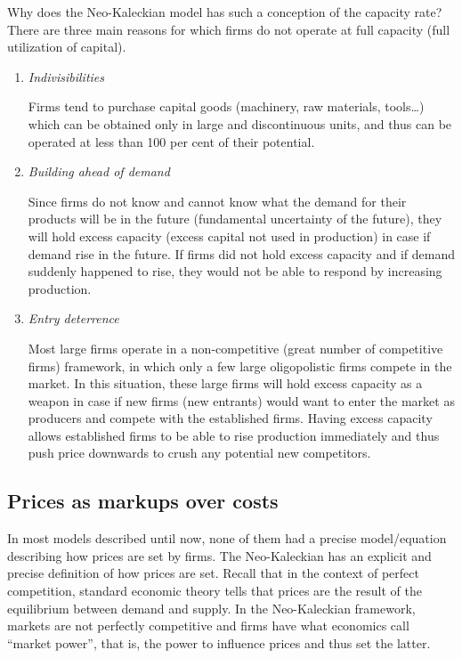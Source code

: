 \documentclass[
  letterpaper,
  DIV=11,
  numbers=noendperiod]{scrreprt}
\begin{document}
Why does the Neo-Kaleckian model has such a conception of the capacity
rate? There are three main reasons for which firms do not operate at
full capacity (full utilization of capital).

\begin{enumerate}
\def\labelenumi{\arabic{enumi}.}
\item
  \emph{Indivisibilities}

  Firms tend to purchase capital goods (machinery, raw materials,
  tools\ldots) which can be obtained only in large and discontinuous
  units, and thus can be operated at less than 100 per cent of their
  potential.
\item
  \emph{Building ahead of demand}

  Since firms do not know and cannot know what the demand for their
  products will be in the future (fundamental uncertainty of the
  future), they will hold excess capacity (excess capital not used in
  production) in case if demand rise in the future. If firms did not
  hold excess capacity and if demand suddenly happened to rise, they
  would not be able to respond by increasing production.
\item
  \emph{Entry deterrence}

  Most large firms operate in a non-competitive (great number of
  competitive firms) framework, in which only a few large oligopolistic
  firms compete in the market. In this situation, these large firms will
  hold excess capacity as a weapon in case if new firms (new entrants)
  would want to enter the market as producers and compete with the
  established firms. Having excess capacity allows established firms to
  be able to rise production immediately and thus push price downwards
  to crush any potential new competitors.
\end{enumerate}

\hypertarget{prices-as-markups-over-costs}{%
\subsection{Prices as markups over
costs}\label{prices-as-markups-over-costs}}

In most models described until now, none of them had a precise
model/equation describing how prices are set by firms. The Neo-Kaleckian
has an explicit and precise definition of how prices are set. Recall
that in the context of perfect competition, standard economic theory
tells that prices are the result of the equilibrium between demand and
supply. In the Neo-Kaleckian framework, markets are not perfectly
competitive and firms have what economics call ``market power'', that
is, the power to influence prices and thus set the latter.
\end{document}
